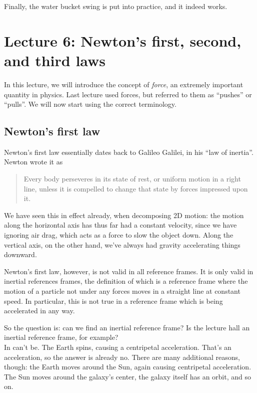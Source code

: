 Finally, the water bucket swing is put into practice, and it indeed works.

\section{Lecture 6: Newton's first, second, and third laws}

In this lecture, we will introduce the concept of \emph{force}, an extremely important quantity in physics. Last lecture used forces, but referred to them as ``pushes'' or ``pulls''. We will now start using the correct terminology.

\subsection{Newton's first law}

Newton's first law essentially dates back to Galileo Galilei, in his ``law of inertia''.\\
Newton wrote it as

\begin{quote}
Every body perseveres in its state of rest, or uniform motion in a right line, unless it is compelled to change that state by forces impressed upon it.
\end{quote}

We have seen this in effect already, when decomposing 2D motion: the motion along the horizontal axis has thus far had a constant velocity, since we have ignoring air drag, which acts as a force to slow the object down. Along the vertical axis, on the other hand, we've always had gravity accelerating things downward.

Newton's first law, however, is not valid in all reference frames. It is only valid in inertial references frames, the definition of which is a reference frame where the motion of a particle not under any forces moves in a straight line at constant speed. In particular, this is not true in a reference frame which is being accelerated in any way.

So the question is: can we find an inertial reference frame? Is the lecture hall an inertial reference frame, for example?\\
In can't be. The Earth spins, causing a centripetal acceleration. That's an acceleration, so the answer is already no. There are many additional reasons, though: the Earth moves around the Sun, again causing centripetal acceleration. The Sun moves around the galaxy's center, the galaxy itself has an orbit, and so on.

